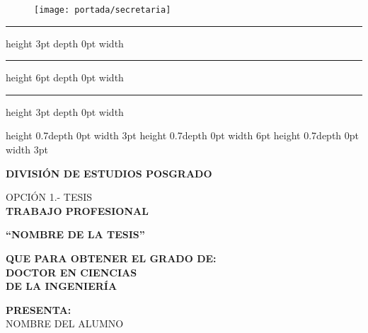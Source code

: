 \begin{titlepage}
    \vspace*{-2cm}
    \begin{figure}[H]
        \texttt{[image: portada/secretaria]}
    \end{figure}
    
    \hrule height 3pt depth 0pt width \textwidth
    \vspace{2pt}
    \hrule height 6pt depth 0pt width \textwidth
    \vspace{2pt}
    \hrule height 3pt depth 0pt width \textwidth
    
    \hspace{12pt}
    \vrule height 0.7\textheight depth 0pt width 3pt
    \hspace{-1pt}
    \vrule height 0.7\textheight depth 0pt width 6pt
    \hspace{-1pt}
    \vrule height 0.7\textheight depth 0pt width 3pt
    
    \vspace*{-165mm}
    
    \begin{center}
        \textbf{DIVISIÓN DE ESTUDIOS POSGRADO}
    \end{center}
    
    \vspace{0.2\baselineskip}
    \begin{center}
        \fontsize{11}{12}\selectfont OPCIÓN 1.- TESIS \\
        \fontsize{12}{12}\selectfont \textbf{TRABAJO PROFESIONAL}
    \end{center}
    
    \vspace{0.5\baselineskip}
    \begin{center}
        \textbf{``NOMBRE DE LA TESIS''}
    \end{center}
    
    \vspace{0.5\baselineskip}
    \begin{center}
        \fontsize{11}{12}\selectfont \textbf{QUE PARA OBTENER EL GRADO DE:} \\
        \fontsize{12}{12}\selectfont \textbf{DOCTOR EN CIENCIAS} \\
        \fontsize{12}{12}\selectfont \textbf{DE LA INGENIERÍA}
    \end{center}
    
    \vspace{0.5\baselineskip}
    \begin{center}
        \fontsize{11}{12}\selectfont \textbf{PRESENTA:} \\
        \fontsize{12}{12}\selectfont NOMBRE DEL ALUMNO
    \end{center}
    

\end{titlepage}
